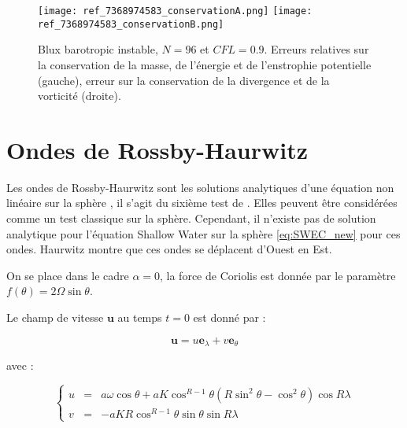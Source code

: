 \begin{figure}[htbp]
\begin{center}
\texttt{[image: ref\_7368974583\_conservationA.png]}
\texttt{[image: ref\_7368974583\_conservationB.png]}
\end{center}
\caption{Blux barotropic instable, $N=96$ et $CFL=0.9$. Erreurs relatives sur la conservation de la masse, de l'énergie et de l'enstrophie potentielle (gauche), erreur sur la conservation de la divergence et de la vorticité (droite).}
\label{fig: galewsky conservation}
\end{figure}






















\newpage
\section{Ondes de Rossby-Haurwitz}

Les ondes de Rossby-Haurwitz sont les solutions analytiques d'une équation non linéaire sur la sphère \cite{Haurwitz1940}, il s'agit du sixième test de \cite{Williamson1992}. Elles peuvent être considérées comme un test classique sur la sphère. Cependant, il n'existe pas de solution analytique pour l'équation Shallow Water sur la sphère \eqref{eq:SWEC_new} pour ces ondes. Haurwitz montre que ces ondes se déplacent d'Ouest en Est.

On se place dans le cadre $\alpha = 0$, la force de Coriolis est donnée par le paramètre $f(\theta) = 2 \Omega \sin \theta$.

Le champ de vitesse $\mathbf{u}$ au temps $t=0$ est donné par :

\begin{equation}
\mathbf{u} = u \mathbf{e}_{\lambda} + v \mathbf{e}_{\theta}
\end{equation}

avec :

\begin{equation}
\left\lbrace
\begin{array}{rcl}
u & = & a \omega \cos \theta + a K \cos^{R-1} \theta \left( R \sin^2 \theta - \cos^2 \theta \right) \cos R \lambda\\
v & = & - a K R \cos^{R-1} \theta \sin \theta \sin R \lambda
\end{array}
\right.
\end{equation}

